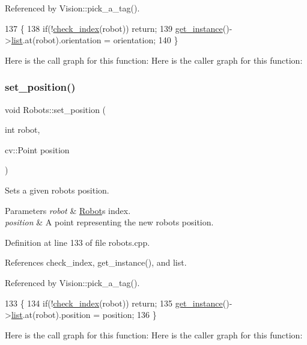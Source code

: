 Referenced by Vision\+::pick\+\_\+a\+\_\+tag().


\begin{DoxyCode}
137                                                           \{
138     \textcolor{keywordflow}{if}(!\hyperlink{robots_8hpp_ae3e6ae8f87cdc750c0b99bc609d9ae43}{check\_index}(robot)) \textcolor{keywordflow}{return};
139     \hyperlink{class_robots_a589bce74db5f34af384952d48435168f}{get\_instance}()->\hyperlink{class_robots_a2c6b77265028f82a4342ca1ef15ed305}{list}.at(robot).orientation = orientation;
140 \}
\end{DoxyCode}
Here is the call graph for this function\+:
Here is the caller graph for this function\+:
\mbox{\label{class_robots_a96ac427f418c25db0c74295f75a58cbb}} 
\subsubsection{\texorpdfstring{set\+\_\+position()}{set\_position()}}
{\footnotesize\ttfamily void Robots\+::set\+\_\+position (\begin{DoxyParamCaption}\item[{int}]{robot,  }\item[{cv\+::\+Point}]{position }\end{DoxyParamCaption})\hspace{0.3cm}{\ttfamily [static]}}

Sets a given robot\textquotesingle{}s position. 
\begin{DoxyParams}{Parameters}
{\em robot} & \hyperlink{struct_robots_1_1_robot}{Robot}\textquotesingle{}s index. \\
\hline
{\em position} & A point representing the new robot\textquotesingle{}s position. \\
\hline
\end{DoxyParams}


Definition at line 133 of file robots.\+cpp.



References check\+\_\+index, get\+\_\+instance(), and list.



Referenced by Vision\+::pick\+\_\+a\+\_\+tag().


\begin{DoxyCode}
133                                                      \{
134     \textcolor{keywordflow}{if}(!\hyperlink{robots_8hpp_ae3e6ae8f87cdc750c0b99bc609d9ae43}{check\_index}(robot)) \textcolor{keywordflow}{return};
135     \hyperlink{class_robots_a589bce74db5f34af384952d48435168f}{get\_instance}()->\hyperlink{class_robots_a2c6b77265028f82a4342ca1ef15ed305}{list}.at(robot).position = position;
136 \}
\end{DoxyCode}
Here is the call graph for this function\+:
Here is the caller graph for this function\+:
\mbox{\label{class_robots_a3694b6380b113b7c38a252fd3bbfcca3}} 
